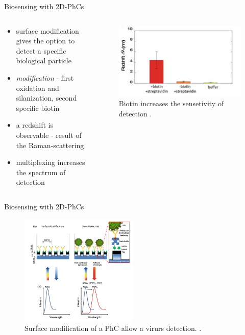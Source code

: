 \begin{frame}{Biosensing with 2D-PhCs}
  \begin{columns}

  \begin{column}{0.49\textwidth}
    \begin{itemize}
    \setlength\itemsep{1.2em}
    \item{ surface modification gives the option to detect a specific biological particle}
    \item{ \emph{modification} - first oxidation and silanization, second specific biotin}
    \item { a redshift is observable - result of the Raman-scattering}
    \item{ multiplexing increases the spectrum of detection}
  \end{itemize}
  \end{column}

  \begin{column}{0.49\textwidth}
  \begin{figure}
    \centering
    \includegraphics[width=1\textwidth]{./bilder/biotin.png}
    \caption{Biotin increases the sensetivity of detection \cite{nano}.}
    \label{fig: redshift}
  \end{figure}
\end{column}
\end{columns}
\end{frame}
\begin{frame}{Biosensing with 2D-PhCs}
  \begin{figure}
    \centering
    \includegraphics[width=0.5\textwidth]{./bilder/reflektion.png}
    \caption{Surface modification of a PhC allow a virurs detection. \cite{nano}.}
    \label{fig: virus detection}
  \end{figure}

\end{frame}

